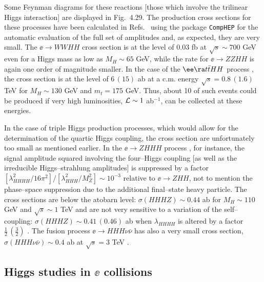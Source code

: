 {Some Feynman diagrams for these reactions [those which involve the trilinear
Higgs interaction] are displayed in Fig.~4.29. The production cross sections
for these processes have been calculated in
Refs.~\cite{ee-H3-Ilyn} using the package {\tt CompHEP}
\cite{Comphep} for the automatic evaluation of the full set of amplitudes and,
as expected, they are very small. The $\ee \to WWHH$ cross section is at the
level of 0.03 fb at $\sqrt s \sim 700$ GeV even for a Higgs mass as
low as $M_H \sim 65$ GeV, while the rate for $\ee \to ZZHH$ is again one
order of magnitude smaller. In the case of the 
$\ee \ra t \bar t HH$ process \cite{ee-H3-Ilyn,ee-H3-Sampayo}, the cross
section is at the level of $6\, (15)$ ab at a c.m. energy $\sqrt s =0.8\,
(1.6)$ TeV for $M_H\sim 130$ GeV and $m_t=175$ GeV. Thus, about 10 of such
events could be produced if very high luminosities, ${\cal L}\sim 1$ ab$^{-1}$,
can be collected at these energies. \s

In the case of triple Higgs production processes, which would allow for the
determination of the quartic Higgs coupling, the cross section are
unfortunately too small as mentioned earlier. In the $\ee \to ZHHH$ process
\cite{ee-DKMZ,ee-H3-Ilyn}, for instance, the signal amplitude squared involving
the four--Higgs coupling [as well as the irreducible Higgs--strahlung 
amplitudes]
is suppressed by a factor $[\lambda_{HHHH}^2/16\pi^2]/[\lambda_{HHH}^2/M_Z^2]
\sim 10^{-3}$ relative to $\ee \to ZHH$, not to mention the phase--space
suppression due to the additional final--state heavy particle. The cross
sections are below the atobarn level: $\sigma (HHHZ) \sim 0.44$ ab for $M_H
\sim 110$ GeV and $\sqrt s \sim 1$ TeV and are not very sensitive to a
variation of the self--coupling: $\sigma (HHHZ) \sim 0.41\, (0.46)$ ab when
$\lambda_{HHHH}$ is altered by a factor $\frac12 \, (\frac32)$ 
\cite{ee-DKMZ}.  The fusion
process $\ee \to HHH \nu \bar \nu$ has also a very small cross section, $\sigma
(HHH \nu \bar \nu) \sim 0.4$ ab at $\sqrt s =3$ TeV \cite{ee-H3-Battaglia}.  

\subsection{Higgs studies in $\ee$ collisions}

}
